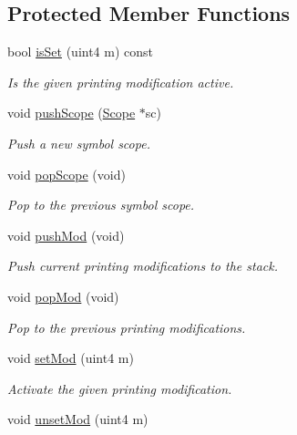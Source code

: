 \subsection*{Protected Member Functions}
\begin{DoxyCompactItemize}
\item 
bool \mbox{\hyperlink{class_print_language_a5341048f4596e03bd186dd1468183220}{is\+Set}} (uint4 m) const
\begin{DoxyCompactList}\small\item\em Is the given printing modification active. \end{DoxyCompactList}\item 
void \mbox{\hyperlink{class_print_language_a5269a74d663ef92b7d7f484ea02b085d}{push\+Scope}} (\mbox{\hyperlink{class_scope}{Scope}} $\ast$sc)
\begin{DoxyCompactList}\small\item\em Push a new symbol scope. \end{DoxyCompactList}\item 
void \mbox{\hyperlink{class_print_language_a2f80f78f12dc9c88010ca720dccc9621}{pop\+Scope}} (void)
\begin{DoxyCompactList}\small\item\em Pop to the previous symbol scope. \end{DoxyCompactList}\item 
void \mbox{\hyperlink{class_print_language_a68e2ed7abe5834cc7301925779e3fc34}{push\+Mod}} (void)
\begin{DoxyCompactList}\small\item\em Push current printing modifications to the stack. \end{DoxyCompactList}\item 
void \mbox{\hyperlink{class_print_language_a4632e44b574dba8a818163edae913cd8}{pop\+Mod}} (void)
\begin{DoxyCompactList}\small\item\em Pop to the previous printing modifications. \end{DoxyCompactList}\item 
void \mbox{\hyperlink{class_print_language_a41989161469e866dc8af2b9f4726fb35}{set\+Mod}} (uint4 m)
\begin{DoxyCompactList}\small\item\em Activate the given printing modification. \end{DoxyCompactList}\item 
void \mbox{\hyperlink{class_print_language_a5cb6bbf5e82586e921fea96051b7123b}{unset\+Mod}} (uint4 m)

\end{DoxyCompactItemize}
